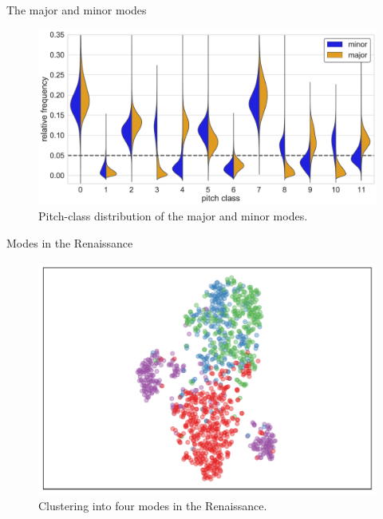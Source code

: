 \begin{frame}{The major and minor modes}
    \begin{figure}
        \includegraphics[width=\linewidth,height=.8\textheight,keepaspectratio]{img/Figure8.pdf}
        \caption{Pitch-class distribution of the major and minor modes.}
    \end{figure}
\end{frame}

\begin{frame}{Modes in the Renaissance}
    \begin{figure}
        \includegraphics[width=\linewidth,height=.8\textheight,keepaspectratio]{img/Figure6.pdf}
        \caption{Clustering into four modes in the Renaissance.}
    \end{figure}
\end{frame}

